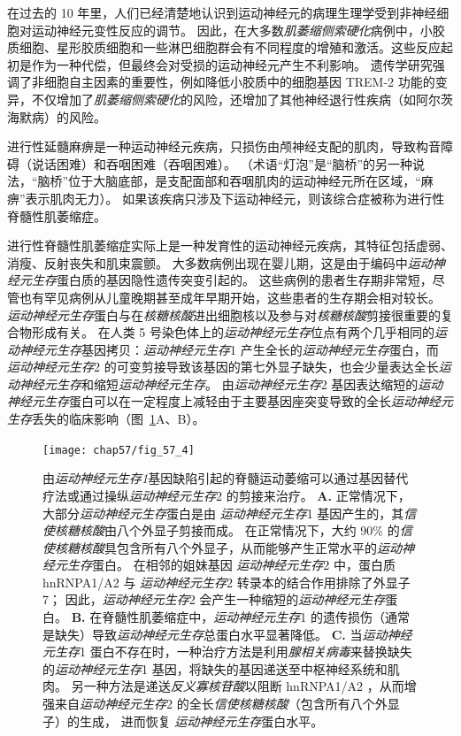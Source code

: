 在过去的 10 年里，人们已经清楚地认识到运动神经元的病理生理学受到非神经细胞对运动神经元变性反应的调节。
因此，在大多数\textit{肌萎缩侧索硬化}病例中，小胶质细胞、星形胶质细胞和一些淋巴细胞群会有不同程度的增殖和激活。这些反应起初是作为一种代偿，但最终会对受损的运动神经元产生不利影响。
遗传学研究强调了非细胞自主因素的重要性，例如降低小胶质中的细胞基因 TREM-2 功能的变异，不仅增加了\textit{肌萎缩侧索硬化}的风险，还增加了其他神经退行性疾病（如阿尔茨海默病）的风险。


进行性延髓麻痹是一种运动神经元疾病，只损伤由颅神经支配的肌肉，导致构音障碍（说话困难）和吞咽困难（吞咽困难）。 
（术语“灯泡”是“脑桥”的另一种说法，“脑桥”位于大脑底部，是支配面部和吞咽肌肉的运动神经元所在区域，“麻痹”表示肌肉无力）。
如果该疾病只涉及下运动神经元，则该综合症被称为进行性脊髓性肌萎缩症。


进行性脊髓性肌萎缩症实际上是一种发育性的运动神经元疾病，其特征包括虚弱、消瘦、反射丧失和肌束震颤。
大多数病例出现在婴儿期，这是由于编码中\textit{运动神经元生存}蛋白质的基因隐性遗传突变引起的。
这些病例的患者生存期非常短，尽管也有罕见病例从儿童晚期甚至成年早期开始，这些患者的生存期会相对较长。
\textit{运动神经元生存}蛋白与在\textit{核糖核酸}进出细胞核以及参与对\textit{核糖核酸}剪接很重要的复合物形成有关。
在人类 5 号染色体上的\textit{运动神经元生存}位点有两个几乎相同的\textit{运动神经元生存}基因拷贝：\textit{运动神经元生存}1 产生全长的\textit{运动神经元生存}蛋白，而 \textit{运动神经元生存}2 的可变剪接导致该基因的第七外显子缺失，也会少量表达全长\textit{运动神经元生存}和缩短\textit{运动神经元生存}。
由\textit{运动神经元生存}2 基因表达缩短的\textit{运动神经元生存}蛋白可以在一定程度上减轻由于主要基因座突变导致的全长\textit{运动神经元生存}丢失的临床影响（图~\ref{fig:57_4}A、B）。


\begin{figure}[htbp]
	\centering
	\texttt{[image: chap57/fig\_57\_4]}
	\caption{由\textit{运动神经元生存1}基因缺陷引起的脊髓运动萎缩可以通过基因替代疗法或通过操纵\textit{运动神经元生存}2 的剪接来治疗。
		\textbf{A.} 正常情况下，大部分\textit{运动神经元生存}蛋白是由 \textit{运动神经元生存}1 基因产生的，其\textit{信使核糖核酸}由八个外显子剪接而成。
		在正常情况下，大约 90\% 的\textit{信使核糖核酸}具包含所有八个外显子，从而能够产生正常水平的\textit{运动神经元生存}蛋白。
		在相邻的姐妹基因 \textit{运动神经元生存}2 中，蛋白质 hnRNPA1/A2 与 \textit{运动神经元生存}2 转录本的结合作用排除了外显子 7；
		因此，\textit{运动神经元生存}2 会产生一种缩短的\textit{运动神经元生存}蛋白。
		\textbf{B.} 在脊髓性肌萎缩症中，\textit{运动神经元生存}1 的遗传损伤（通常是缺失）导致\textit{运动神经元生存}总蛋白水平显著降低。
		\textbf{C.} 当\textit{运动神经元生存}1 蛋白不存在时，一种治疗方法是利用\textit{腺相关病毒}来替换缺失的\textit{运动神经元生存}1 基因，将缺失的基因递送至中枢神经系统和肌肉。
		另一种方法是递送\textit{反义寡核苷酸}以阻断 hnRNPA1/A2 ，从而增强来自\textit{运动神经元生存}2 的全长\textit{信使核糖核酸}（包含所有八个外显子）的生成，
		进而恢复 \textit{运动神经元生存}蛋白水平。}
	\label{fig:57_4}
\end{figure}


